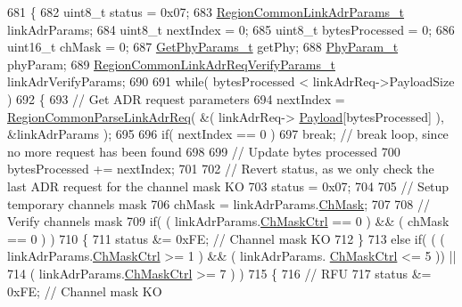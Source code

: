 \begin{DoxyCode}
681 \{
682     uint8\_t status = 0x07;
683     \mbox{\hyperlink{structs_region_common_link_adr_params}{RegionCommonLinkAdrParams\_t}} linkAdrParams;
684     uint8\_t nextIndex = 0;
685     uint8\_t bytesProcessed = 0;
686     uint16\_t chMask = 0;
687     \mbox{\hyperlink{structs_get_phy_params}{GetPhyParams\_t}} getPhy;
688     \mbox{\hyperlink{unionu_phy_param}{PhyParam\_t}} phyParam;
689     \mbox{\hyperlink{structs_region_common_link_adr_req_verify_params}{RegionCommonLinkAdrReqVerifyParams\_t}} linkAdrVerifyParams;
690 
691     \textcolor{keywordflow}{while}( bytesProcessed < linkAdrReq->PayloadSize )
692     \{
693         \textcolor{comment}{// Get ADR request parameters}
694         nextIndex = \mbox{\hyperlink{group___r_e_g_i_o_n_c_o_m_m_o_n_ga8403c78482dbb901014dba48b75d78e8}{RegionCommonParseLinkAdrReq}}( &( linkAdrReq->
      \mbox{\hyperlink{structs_link_adr_req_params_a3dfbfe76c8f3bd25765750487b815147}{Payload}}[bytesProcessed] ), &linkAdrParams );
695 
696         \textcolor{keywordflow}{if}( nextIndex == 0 )
697             \textcolor{keywordflow}{break}; \textcolor{comment}{// break loop, since no more request has been found}
698 
699         \textcolor{comment}{// Update bytes processed}
700         bytesProcessed += nextIndex;
701 
702         \textcolor{comment}{// Revert status, as we only check the last ADR request for the channel mask KO}
703         status = 0x07;
704 
705         \textcolor{comment}{// Setup temporary channels mask}
706         chMask = linkAdrParams.\mbox{\hyperlink{structs_region_common_link_adr_params_adb3d38c312a46e617b1319f97dd56a87}{ChMask}};
707 
708         \textcolor{comment}{// Verify channels mask}
709         \textcolor{keywordflow}{if}( ( linkAdrParams.\mbox{\hyperlink{structs_region_common_link_adr_params_ac5e1891f30a172b2ce39bc3498e1843d}{ChMaskCtrl}} == 0 ) && ( chMask == 0 ) )
710         \{
711             status &= 0xFE; \textcolor{comment}{// Channel mask KO}
712         \}
713         \textcolor{keywordflow}{else} \textcolor{keywordflow}{if}( ( ( linkAdrParams.\mbox{\hyperlink{structs_region_common_link_adr_params_ac5e1891f30a172b2ce39bc3498e1843d}{ChMaskCtrl}} >= 1 ) && ( linkAdrParams.
      \mbox{\hyperlink{structs_region_common_link_adr_params_ac5e1891f30a172b2ce39bc3498e1843d}{ChMaskCtrl}} <= 5 )) ||
714                 ( linkAdrParams.\mbox{\hyperlink{structs_region_common_link_adr_params_ac5e1891f30a172b2ce39bc3498e1843d}{ChMaskCtrl}} >= 7 ) )
715         \{
716             \textcolor{comment}{// RFU}
717             status &= 0xFE; \textcolor{comment}{// Channel mask KO}

\end{DoxyCode}

